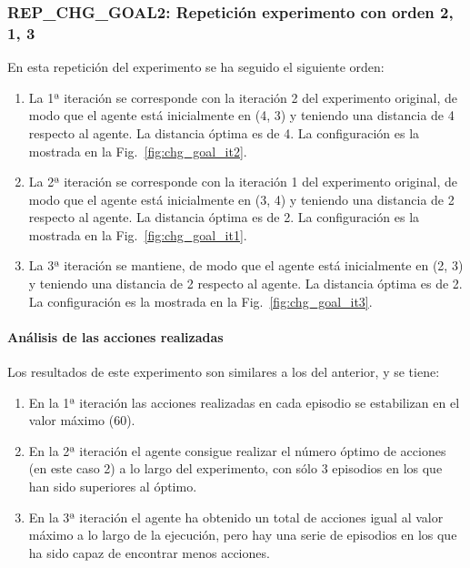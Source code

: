 \subsubsection{REP\_CHG\_GOAL2: Repetición experimento con orden 2, 1, 3} \label{REP_CHG_GOAL2}

En esta repetición del experimento se ha seguido el siguiente orden: 
\begin{enumerate}
    \item La 1ª iteración se corresponde con la iteración 2 del experimento original, de modo que el agente está inicialmente en (4, 3) y teniendo una distancia de 4 respecto al agente. La distancia óptima es de 4. La configuración es la mostrada en la Fig.~\ref{fig:chg_goal_it2}.
    \item La 2ª iteración se corresponde con la iteración 1 del experimento original, de modo que el agente está inicialmente en (3, 4) y teniendo una distancia de 2 respecto al agente. La distancia óptima es de 2. La configuración es la mostrada en la Fig.~\ref{fig:chg_goal_it1}.
    \item La 3ª iteración se mantiene, de modo que el agente está inicialmente en (2, 3) y teniendo una distancia de 2 respecto al agente. La distancia óptima es de 2. La configuración es la mostrada en la Fig.~\ref{fig:chg_goal_it3}.
\end{enumerate}

\paragraph{Análisis de las acciones realizadas}

Los resultados de este experimento son similares a los del anterior, y se tiene: 
\begin{enumerate}
    \item En la 1ª iteración las acciones realizadas en cada episodio se estabilizan en el valor máximo (60).
    \item En la 2ª iteración el agente consigue realizar el número óptimo de acciones (en este caso 2) a lo largo del experimento, con sólo 3 episodios en los que han sido superiores al óptimo. 
    \item En la 3ª iteración el agente ha obtenido un total de acciones igual al valor máximo a lo largo de la ejecución, pero hay una serie de episodios en los que ha sido capaz de encontrar menos acciones. 
\end{enumerate}

